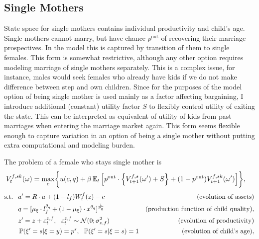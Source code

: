 \subsection{Single Mothers}
State space for single mothers contains individual productivity and child's age. Single mothers cannot marry, but have chance $p^{\text{out}}$ of recovering their marriage prospectives. In the model this is captured by transition of them to single females. This form is somewhat restrictive, although any other option requires modeling marriage of single mothers separately. This is a complex issue, for instance, males would seek females who already have kids if we do not make difference between step and own children. Since for the purposes of the model option of being single mother is used mainly as a factor affecting bargaining, I introduce additional (constant) utility factor $S$ to flexibly control utility of exiting the state. This can be interpreted as equivalent of utility of kids from past marriages when entering the marriage market again. This form seems flexible enough to capture variation in an option of being a single mother without putting extra computational and modeling burden.

The problem of a female who stays single mother is
\begin{align}V^{f,sk}_t(\omega) = \max\limits_{c} & \bigg\{ u(c,q) + \beta \E_t \Big[ p^{\text{out}} \cdot \left\{ V^{f,s}_{t+1}(\omega') + S\right\} +(1-p^{\text{out}})V^{f,sk}_{t+1}(\omega') \Big]  \bigg\},
\end{align}\vspace{-1em}
\begin{align*}
 \text{s.t. \ }  &  a' = R\cdot a  + (1-l_f)W^f_t(z) - c  & \text{ (evolution of assets)}\\
 & q = [\mu_\xi\cdot l_f^{\theta_q} + (1-\mu_\xi)\cdot x^{\theta_q}]^{\frac1{\theta_q}} & \text{(production function of child quality)},\\
 &  z' = z + \varepsilon^{z,f}_t, \ \ \varepsilon^{z,f}_t \sim \mathcal{N}(0;\sigma_{z,f}^2) &  \text{ (evolution of productivity)}\\
 &  \P(\xi' = s | \xi = y) = p^s, \ \ \P(\xi' = s | \xi = s) = 1 & \text{(evolution of child's age)},\\
\end{align*}

